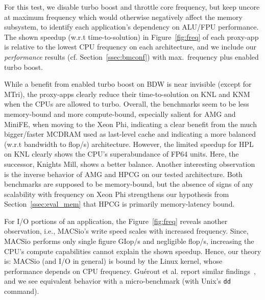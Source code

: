 For this test, we disable turbo boost and throttle core frequency, but keep uncore at maximum frequency which would otherwise negatively
affect the memory subsystem, to identify each application's dependency on ALU/FPU performance. The shown speedup (w.r.t time-to-solution) in Figure~\ref{fig:freq}
of each proxy-app is relative to the lowest CPU frequency on each architecture, and we include our \textit{performance} results
(cf. Section~\ref{ssec:bmconf}) with max.~frequency plus enabled turbo boost.

While a benefit from enabled turbo boost on BDW is near invisible (except for MTri), the proxy-apps clearly reduce their
time-to-solution on KNL and KNM when the CPUs are allowed to turbo. Overall, the benchmarks seem to be less memory-bound
and more compute-bound, especially salient for AMG and MiniFE,  when moving to the Xeon Phi, indicating a clear benefit
from the much bigger/faster MCDRAM used as last-level cache and indicating a more balanced
(w.r.t bandwidth to \unit[]{flop/s}) architecture.
However, the limited speedup for HPL on KNL clearly shows the CPU's superabundance of FP64 units.
Here, the successor, Knights Mill, shows a better balance.
Another interesting observation is the inverse behavior of AMG and HPCG on our tested architecture.
Both benchmarks are supposed to be memory-bound, but the absence of signs of any scalability with frequency on Xeon Phi
strengthens our hypothesis from Section~\ref{ssec:eval_mem} that HPCG is primarily memory-latency bound.

For I/O portions of an application, the Figure~\ref{fig:freq} reveals another observation, i.e., MACSio's write speed
scales with increased frequency. Since, MACSio performs only single figure \unit[]{GIop/s} and negligible
\unit[]{flop/s}, increasing the CPU's compute capabilities cannot explain the shown speedup.
Hence, our theory is: MACSio (and I/O in general) is bound by the Linux kernel, whose performance depends on CPU frequency.
Gu{\'e}rout et al. report similar findings~\cite{guerout_energy-aware_2013}, and we see equivalent behavior with 
a micro-benchmark (with Unix's \texttt{dd} command).


